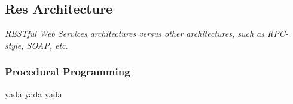 \subsection{Res Architecture}
\begin{center}\textit{RESTful Web Services architectures versus other architectures, such as RPC-style, SOAP, etc.}\end{center}

\subsubsection{Procedural Programming} 
yada yada yada